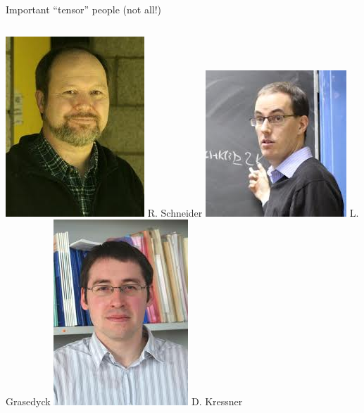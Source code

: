 \documentclass{beamer}[14pt, presentation]
\begin{document}
\begin{frame}[label=sec-1-3]{Important ``tensor'' people (not all!)}
\begin{columns}
\begin{column}{0.25\textwidth}
\includegraphics[height=0.15\textheight]{schneider.jpeg}
\vskip 2mm
{\footnotesize R. Schneider}
\vskip 2mm
\includegraphics[height=0.15\textheight]{grasedyck.jpeg}
\vskip 2mm
{\footnotesize L. Grasedyck}
\vskip 2mm
\includegraphics[height=0.15\textheight]{kressner.jpeg}
\vskip 2mm
{\footnotesize D. Kressner}
\end{column}


\end{columns}
\end{frame}
\end{document}
